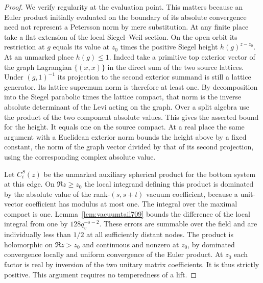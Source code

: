 \documentclass[a4paper,11pt]{article}
\theoremstyle{definition}
\theoremstyle{remark}
\numberwithin{equation}{section}
\begin{document}
\begin{proof}
We verify regularity at the evaluation point. This matters
because an Euler product initially evaluated on the boundary
of its absolute convergence need not represent a Petersson
norm by mere substitution. At any finite place take a flat
extension of the local Siegel--Weil section. On the open orbit
its restriction at \(g\) equals its value at \(z_0\) times
the positive Siegel height \(h(g)^{z-z_0}\). At an unmarked
place \(h(g)\leq1\). Indeed take a primitive top exterior
vector of the graph Lagrangian \(\{(x,x)\}\) in the direct
sum of the two source lattices. Under \((g,1)^{-1}\) its
projection to the second exterior summand is still a lattice
generator. Its lattice supremum norm is therefore at least one.
By decomposition into the Siegel parabolic times the lattice
compact, that norm is the inverse absolute determinant of the
Levi acting on the graph. Over a split algebra use the product
of the two component absolute values. This gives the asserted
bound for the height. It equals one on the source compact.
At a real place the same argument with a Euclidean exterior
norm bounds the height above by a fixed constant, the norm
of the graph vector divided by that of its second projection,
using the corresponding complex absolute value.

Let \(C_i^S(z)\) be the unmarked auxiliary spherical product
for the bottom system at this edge. On \(\Re z\geq z_0\) the
local integrand defining this product is dominated by the
absolute value of the rank-\((s,s+t)\) vacuum coefficient,
because a unit-vector coefficient has modulus at most one.
The integral over the maximal compact is one.
Lemma~\ref{lem:vacuumtail709} bounds the difference of the
local integral from one by \(128q_v^{-s-2}\). These errors are
summable over the field and are individually less than \(1/2\)
at all sufficiently distant nodes. The product is holomorphic
on \(\Re z>z_0\) and continuous and nonzero at \(z_0\), by
dominated convergence locally and uniform convergence of the
Euler product. At \(z_0\) each factor is real by inversion of
the two unitary matrix coefficients. It is thus strictly
positive. This argument requires no temperedness of a lift.


\end{proof}
\end{document}
